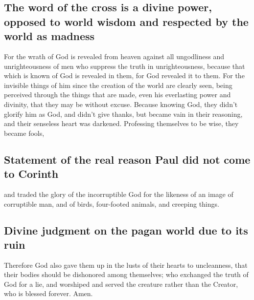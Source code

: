 \hypertarget{the-word-of-the-cross-is-a-divine-power-opposed-to-world-wisdom-and-respected-by-the-world-as-madness}{%
\subsection{The word of the cross is a divine power, opposed to world
wisdom and respected by the world as
madness}\label{the-word-of-the-cross-is-a-divine-power-opposed-to-world-wisdom-and-respected-by-the-world-as-madness}}

 For the wrath of God is revealed from heaven against all
ungodliness and unrighteousness of men who suppress the truth in
unrighteousness,  because that which is known of God is
revealed in them, for God revealed it to them.  For the
invisible things of him since the creation of the world are clearly
seen, being perceived through the things that are made, even his
everlasting power and divinity, that they may be without excuse.
 Because knowing God, they didn't glorify him as God, and
didn't give thanks, but became vain in their reasoning, and their
senseless heart was darkened.  Professing themselves to
be wise, they became fools,

\hypertarget{statement-of-the-real-reason-paul-did-not-come-to-corinth}{%
\subsection{Statement of the real reason Paul did not come to
Corinth}\label{statement-of-the-real-reason-paul-did-not-come-to-corinth}}

 and traded the glory of the incorruptible God for the
likeness of an image of corruptible man, and of birds, four-footed
animals, and creeping things.

\hypertarget{divine-judgment-on-the-pagan-world-due-to-its-ruin}{%
\subsection{Divine judgment on the pagan world due to its
ruin}\label{divine-judgment-on-the-pagan-world-due-to-its-ruin}}

 Therefore God also gave them up in the lusts of their
hearts to uncleanness, that their bodies should be dishonored among
themselves;  who exchanged the truth of God for a lie,
and worshiped and served the creature rather than the Creator, who is
blessed forever. Amen.

